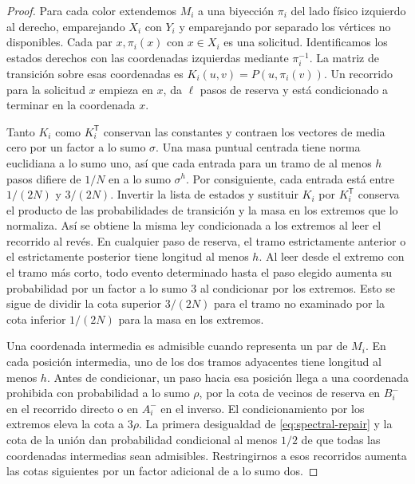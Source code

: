 \begin{proof}
Para cada color extendemos \(M_i\) a una biyección \(\pi_i\) del lado físico izquierdo al derecho, emparejando \(X_i\) con \(Y_i\) y emparejando por separado los vértices no disponibles. Cada par \(x,\pi_i(x)\) con \(x\in X_i\) es una solicitud. Identificamos los estados derechos con las coordenadas izquierdas mediante \(\pi_i^{-1}\). La matriz de transición sobre esas coordenadas es \(K_i(u,v)=P(u,\pi_i(v))\). Un recorrido para la solicitud \(x\) empieza en \(x\), da \(\ell\) pasos de reserva y está condicionado a terminar en la coordenada \(x\).

Tanto \(K_i\) como \(K_i^{\mathsf T}\) conservan las constantes y contraen los vectores de media cero por un factor a lo sumo \(\sigma\). Una masa puntual centrada tiene norma euclidiana a lo sumo uno, así que cada entrada para un tramo de al menos \(h\) pasos difiere de \(1/N\) en a lo sumo \(\sigma^h\). Por consiguiente, cada entrada está entre \(1/(2N)\) y \(3/(2N)\). Invertir la lista de estados y sustituir \(K_i\) por \(K_i^{\mathsf T}\) conserva el producto de las probabilidades de transición y la masa en los extremos que lo normaliza. Así se obtiene la misma ley condicionada a los extremos al leer el recorrido al revés. En cualquier paso de reserva, el tramo estrictamente anterior o el estrictamente posterior tiene longitud al menos \(h\). Al leer desde el extremo con el tramo más corto, todo evento determinado hasta el paso elegido aumenta su probabilidad por un factor a lo sumo \(3\) al condicionar por los extremos. Esto se sigue de dividir la cota superior \(3/(2N)\) para el tramo no examinado por la cota inferior \(1/(2N)\) para la masa en los extremos.

Una coordenada intermedia es admisible cuando representa un par de \(M_i\). En cada posición intermedia, uno de los dos tramos adyacentes tiene longitud al menos \(h\). Antes de condicionar, un paso hacia esa posición llega a una coordenada prohibida con probabilidad a lo sumo \(\rho\), por la cota de vecinos de reserva en \(B_i^-\) en el recorrido directo o en \(A_i^-\) en el inverso. El condicionamiento por los extremos eleva la cota a \(3\rho\). La primera desigualdad de \eqref{eq:spectral-repair} y la cota de la unión dan probabilidad condicional al menos \(1/2\) de que todas las coordenadas intermedias sean admisibles. Restringirnos a esos recorridos aumenta las cotas siguientes por un factor adicional de a lo sumo dos.


\end{proof}
